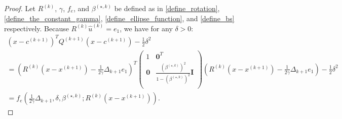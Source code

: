 \documentclass{article}
\theoremstyle{case}
\numberwithin{theorem}{subsection}
\newcommand{\bs}{{\beta^{(\star, k)}}}
\newcommand{\ck}{{c^{(k)}}}
\newcommand{\dk}{\Delta_k}
\newcommand{\dkpo}{\Delta_{k+1}}
\newcommand{\huk}{{{\hat u}^{(k)}}}
\newcommand{\qk}{{Q^{(k)}}}
\newcommand{\rotk}{{R^{(k)}}}
\newcommand{\sdk}{{\delta_k}}
\newcommand{\xkpo}{{{x}^{(k+1)}}}
\newcommand{\xk}{x^{(k)}}
\newcommand{\qkpo}{{Q^{(k+1)}}}
\newcommand{\ckpo}{{c^{(k+1)}}}
\begin{document}
\begin{proof}
Let $\rotk$, $\gamma$, $f_e$, and $\bs$ be defined as in \cref{define_rotation}, \cref{define_the_constant_gamma}, \cref{define_ellipse_function}, and \cref{define_bs} respectively.
Because $\rotk\huk = e_1$, we have for any $\delta > 0$:
\begin{align*}
\left(x - \ckpo\right)^T\qkpo\left(x - \ckpo\right) - \frac 1 2 \delta^2 \\
= \left(\rotk(x-\xkpo) - \frac 1 {2\gamma} \dkpo e_1\right)^T\begin{pmatrix}
1 & \boldsymbol0^T \\
\boldsymbol 0 & \frac{\left(\bs\right)^2}{1 - \left(\bs\right)^2} \boldsymbol I \\
\end{pmatrix} \left(\rotk(x-\xkpo) - \frac 1 {2\gamma} \dkpo e_1\right) - \frac 1 2 \delta^2 \\
= f_e\left(\frac 1 {2\gamma} \dkpo, \delta, \bs; \rotk\left(x - \xkpo\right)\right).
\end{align*}




\end{proof}
\end{document}
